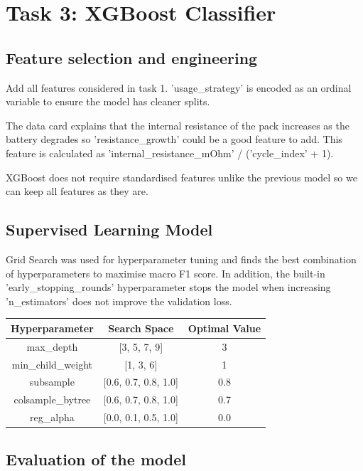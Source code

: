 \documentclass[12pt]{article}
\begin{document}
\section{Task 3: XGBoost Classifier}

\subsection{Feature selection and engineering}

Add all features considered in task 1. 'usage_strategy' is encoded as an ordinal variable to ensure the model has cleaner splits.

The data card explains that the internal resistance of the pack increases as the battery degrades so 'resistance_growth' could be a good feature to add. This feature is calculated as 'internal_resistance_mOhm' / ('cycle_index' + 1).

XGBoost does not require standardised features unlike the previous model so we can keep all features as they are.

\subsection{Supervised Learning Model}

Grid Search was used for hyperparameter tuning and finds the best combination of hyperparameters to maximise macro F1 score. In addition, the built-in 'early_stopping_rounds' hyperparameter stops the model when increasing 'n_estimators' does not improve the validation loss.

\begin{center}
\begin{tabular}{||c c c||} 
 \hline
 Hyperparameter & Search Space & Optimal Value \\ [0.5ex] 
 \hline\hline
 max\_depth & [3, 5, 7, 9] & 3 \\ 
 \hline
 min\_child\_weight & [1, 3, 6] & 1 \\ 
 \hline
 subsample & [0.6, 0.7, 0.8, 1.0] & 0.8 \\ 
 \hline
 colsample\_bytree & [0.6, 0.7, 0.8, 1.0] & 0.7 \\ 
 \hline
 reg\_alpha & [0.0, 0.1, 0.5, 1.0] & 0.0 \\ 
 \hline
\end{tabular}
\end{center}

\subsection{Evaluation of the model}
\end{document}
